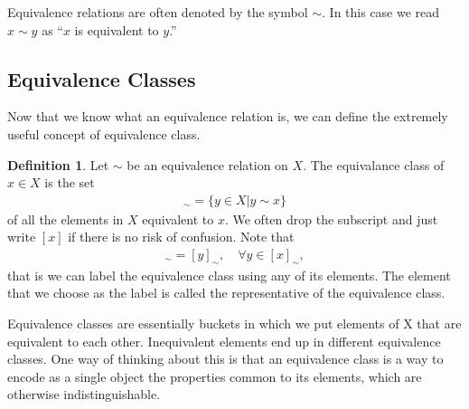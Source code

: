 \documentclass{book}
\theoremstyle{definition}
\newtheorem{defn}{Definition}[section]
\begin{document}
Equivalence relations are often denoted by the symbol $\sim$. In this case we read $x\sim y$ as ``$x$ is equivalent to $y$.'' 





\subsection{Equivalence Classes}

Now that we know what an equivalence relation is, we can define the extremely useful concept of equivalence class.


\begin{defn}
	Let $\sim$ be an equivalence relation on $X$. The equivalance class of $x \in X$ is the set 
	\begin{align}
	[x]_\sim = \{ y\in X \vert y\sim x   \}
	\end{align}
	of all the elements in $X$ equivalent to $x$. We often drop the subscript and just write $[x]$ if there is no risk of confusion. Note that
	\begin{align}
	[x]_\sim = [y]_\sim, \quad \forall y \in [x]_\sim,
	\end{align}
	that is we can label the equivalence class using any of its elements. The element that we
	choose as the label is called the representative of the equivalence class.
\end{defn}



Equivalence classes are essentially buckets in which we put elements of X that are equivalent
to each other. Inequivalent elements end up in different equivalence classes. One way of
thinking about this is that an equivalence class is a way to encode as a single object the
properties common to its elements, which are otherwise indistinguishable.
\end{document}
